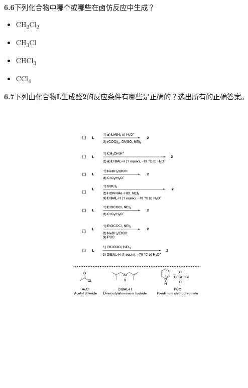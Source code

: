 \noindent\textbf{6.6}下列化合物中哪个或哪些在卤仿反应中生成？

\renewcommand{\labelitemi}{$\square$}
\begin{itemize}
	\item CH\textsubscript{2}Cl\textsubscript{2}
	\item CH\textsubscript{3}Cl
	\item CHCl\textsubscript{3}
	\item CCl\textsubscript{4}
\end{itemize}
\renewcommand{\labelitemi}{$\bullet$}

\newpage\noindent\textbf{6.7}下列由化合物\textbf{L}生成醛\textbf{2}的反应条件有哪些是正确的？选出所有的正确答案。

\begin{figure}[h]
	\includegraphics[width=14cm]{./pic/t6-4.pdf}
\end{figure}

